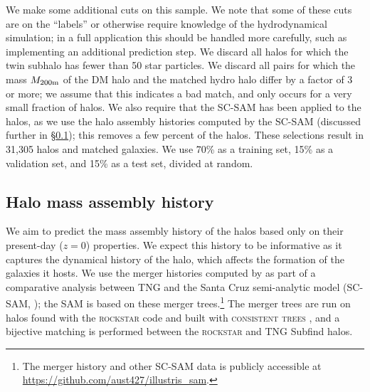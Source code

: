 We make some additional cuts on this sample.
We note that some of these cuts are on the ``labels'' or otherwise require knowledge of the hydrodynamical simulation; in a full application this should be handled more carefully, such as implementing an additional prediction step. 
We discard all \dark halos for which the twin \hydro subhalo has fewer than 50 star particles.
We discard all pairs for which the mass $M_\mathrm{200m}$ of the DM halo and the matched hydro halo differ by a factor of 3 or more; we assume that this indicates a bad match, and only occurs for a very small fraction of halos.
We also require that the SC-SAM has been applied to the halos, as we use the halo assembly histories computed by the SC-SAM (discussed further in \S\ref{sec:mah}); this removes a few percent of the halos.
These selections result in 31,305 \dark halos and matched \hydro galaxies.
We use 70\% as a training set, 15\% as a validation set, and 15\% as a test set, divided at random.


\subsection{Halo mass assembly history}
\label{sec:mah}

We aim to predict the mass assembly history of the \dark halos based only on their present-day ($z=0$) properties.
We expect this history to be informative as it captures the dynamical history of the halo, which affects the formation of the galaxies it hosts.
We use the merger histories computed by \cite{gabrielpillai_galaxy_2021} as part of a comparative analysis between TNG and the Santa Cruz semi-analytic model (SC-SAM, \citealt{somerville_semi-analytic_1999,somerville_semi-analytic_2008, somerville_star_2015}); the SAM is based on these merger trees.\footnote{The merger history and other SC-SAM data is publicly accessible at \url{https://github.com/aust427/illustris_sam}.}
The merger trees are run on halos found with the \textsc{rockstar} \citep{behroozi_rockstar_2013} code and built with \textsc{consistent trees} \citep{behroozi_gravitationally_2012}, and a bijective matching is performed between the \textsc{rockstar} and TNG Subfind halos.

